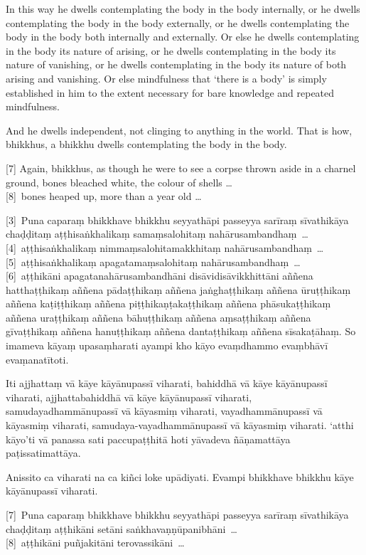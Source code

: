 In this way he dwells contemplating the body in the body internally, or he
dwells contemplating the body in the body externally, or he dwells contemplating
the body in the body both internally and externally. Or else he dwells
contemplating in the body its nature of arising, or he dwells contemplating in
the body its nature of vanishing, or he dwells contemplating in the body its
nature of both arising and vanishing. Or else mindfulness that ‘there is a body’
is simply established in him to the extent necessary for bare knowledge and
repeated mindfulness.

And he dwells independent, not clinging to anything in the world. That is how,
bhikkhus, a bhikkhu dwells contemplating the body in the body.

[7] Again, bhikkhus, as though he were to see a corpse thrown aside in a charnel
ground, bones bleached white, the colour of shells \ldots{}\\
{}[8]~bones heaped up, more than a year old \ldots{}

\paliPage

[3]~Puna caparaṃ bhikkhave bhikkhu seyyathāpi passeyya sarīraṃ
sīvathikāya chaḍḍitaṃ aṭṭhisaṅkhalikaṃ samaṃsalohitaṃ nahārusambandhaṃ~\ldots{}\\
{}[4]~aṭṭhisaṅkhalikaṃ nimmaṃsalohitamakkhitaṃ nahārusambandhaṃ~\ldots{}\\
{}[5]~aṭṭhisaṅkhalikaṃ apagatamaṃsalohitaṃ nahārusambandhaṃ~\ldots{}\\
{}[6]~aṭṭhikāni apagatanahārusambandhāni disāvidisāvikkhittāni aññena
hatthaṭṭhikaṃ aññena pādaṭṭhikaṃ aññena jaṅghaṭṭhikaṃ aññena ūruṭṭhikaṃ aññena
kaṭiṭṭhikaṃ aññena piṭṭhikaṇṭakaṭṭhikaṃ aññena phāsukaṭṭhikaṃ aññena uraṭṭhikaṃ
aññena bāhuṭṭhikaṃ aññena aṃsaṭṭhikaṃ aññena gīvaṭṭhikaṃ aññena hanuṭṭhikaṃ
aññena dantaṭṭhikaṃ aññena sīsakaṭāhaṃ. So imameva kāyaṃ upasaṃharati ayampi kho
kāyo evaṃdhammo evaṃbhāvī evaṃanatītoti.

Iti ajjhattaṃ vā kāye kāyānupassī viharati, bahiddhā vā kāye kāyānupassī
viharati, ajjhattabahiddhā vā kāye kāyānupassī viharati, samudayadhammānupassī
vā kāyasmiṃ viharati, vayadhammānupassī vā kāyasmiṃ viharati,
samudaya-vayadhammānupassī vā kāyasmiṃ viharati. `atthi kāyo'ti vā panassa sati
paccupaṭṭhitā hoti yāvadeva ñāṇamattāya paṭissatimattāya.

Anissito ca viharati na ca kiñci loke upādiyati. Evampi bhikkhave bhikkhu kāye
kāyānupassī viharati.

[7]~Puna caparaṃ bhikkhave bhikkhu seyyathāpi passeyya sarīraṃ sīvathikāya chaḍḍitaṃ
aṭṭhikāni setāni saṅkhavaṇṇūpanibhāni~\ldots{}\\
{}[8]~aṭṭhikāni puñjakitāni terovassikāni~\ldots{}


